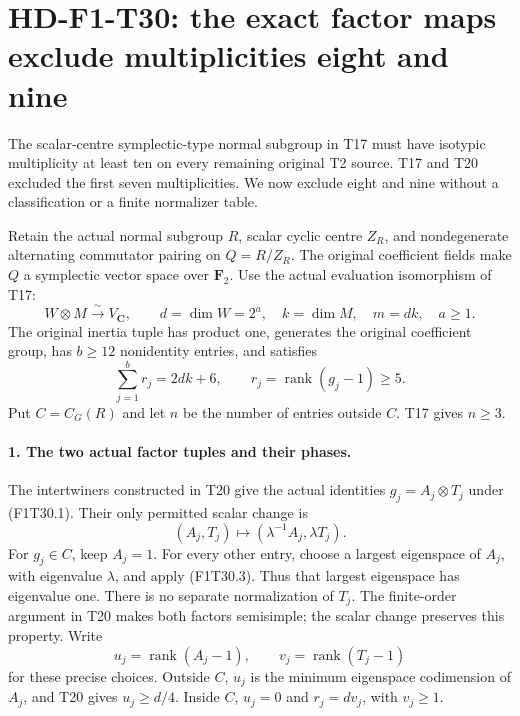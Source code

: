 \section[HD-F1-T30: symplectic multiplicities eight and nine]{HD-F1-T30: the exact factor maps exclude multiplicities eight and nine}
\label{sec:f1-symplectic-eighth-ninth}

The scalar-centre symplectic-type normal subgroup in T17
must have isotypic multiplicity at least ten on every
remaining original T2 source. T17 and T20 excluded the
first seven multiplicities. We now exclude eight and nine
without a classification or a finite normalizer table.

Retain the actual normal subgroup \(R\), scalar cyclic
centre \(Z_R\), and nondegenerate alternating commutator
pairing on \(Q=R/Z_R\). The original coefficient fields
make \(Q\) a symplectic vector space over \(\mathbf F_2\).
Use the actual evaluation isomorphism of T17:
\[
 W\otimes M\xrightarrow{\sim}V_{\mathbf C},\qquad
 d=\dim W=2^a,\quad k=\dim M,\quad m=dk,\quad a\ge1.
 \tag{F1T30.1}
\]
The original inertia tuple has product one, generates
the original coefficient group, has \(b\ge12\) nonidentity
entries, and satisfies
\[
 \sum_{j=1}^b r_j=2dk+6,\qquad
 r_j=\operatorname{rank}(g_j-1)\ge5.
 \tag{F1T30.2}
\]
Put \(C=C_G(R)\) and let \(n\) be the number of entries
outside \(C\). T17 gives \(n\ge3\).

\paragraph{1. The two actual factor tuples and their phases.}
The intertwiners constructed in T20 give the actual
identities \(g_j=A_j\otimes T_j\) under (F1T30.1).
Their only permitted scalar change is
\[
             (A_j,T_j)\longmapsto
                         (\lambda^{-1}A_j,\lambda T_j).
 \tag{F1T30.3}
\]
For \(g_j\in C\), keep \(A_j=1\).
For every other entry, choose a largest eigenspace
of \(A_j\), with eigenvalue \(\lambda\), and apply
(F1T30.3). Thus that largest eigenspace has eigenvalue
one. There is no separate normalization of \(T_j\).
The finite-order argument in T20 makes both factors
semisimple; the scalar change preserves this property.
Write
\[
      u_j=\operatorname{rank}(A_j-1),\qquad
      v_j=\operatorname{rank}(T_j-1)
 \tag{F1T30.4}
\]
for these precise choices. Outside \(C\), \(u_j\) is the
minimum eigenspace codimension of \(A_j\), and T20 gives
\(u_j\ge d/4\). Inside \(C\), \(u_j=0\) and
\(r_j=dv_j\), with \(v_j\ge1\).

